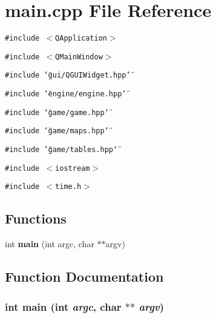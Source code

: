 \section{main.cpp File Reference}
\label{main_8cpp}
{\tt \#include $<$QApplication$>$}\par
{\tt \#include $<$QMain\-Window$>$}\par
{\tt \#include \char`\"{}gui/QGUIWidget.hpp\char`\"{}}\par
{\tt \#include \char`\"{}engine/engine.hpp\char`\"{}}\par
{\tt \#include \char`\"{}game/game.hpp\char`\"{}}\par
{\tt \#include \char`\"{}game/maps.hpp\char`\"{}}\par
{\tt \#include \char`\"{}game/tables.hpp\char`\"{}}\par
{\tt \#include $<$iostream$>$}\par
{\tt \#include $<$time.h$>$}\par
\subsection*{Functions}
\begin{CompactItemize}
\item 
int {\bf main} (int argc, char $\ast$$\ast$argv)
\end{CompactItemize}


\subsection{Function Documentation}
\subsubsection{\setlength{\rightskip}{0pt plus 5cm}int main (int {\em argc}, char $\ast$$\ast$ {\em argv})}\label{main_8cpp_a0}


